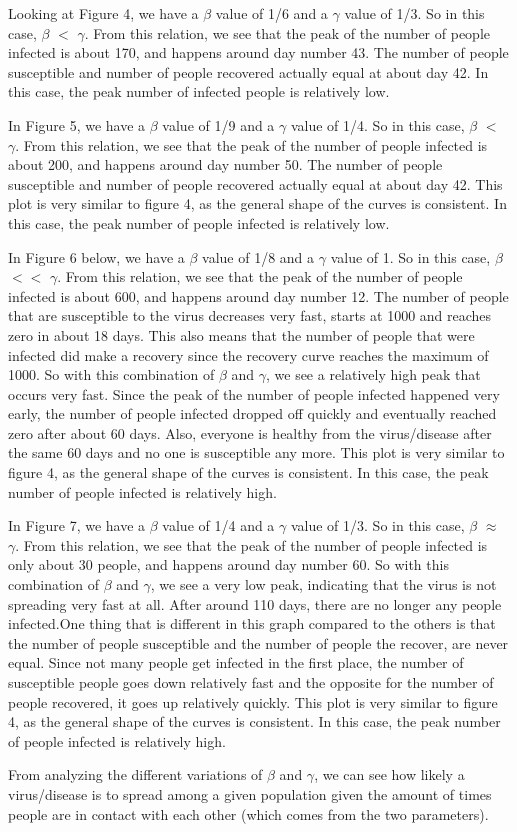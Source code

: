 \documentclass{article}
\begin{document}
Looking at Figure 4, we have a $\beta$ value of 1/6 and a $\gamma$ value of 1/3. 
So in this case, $\beta$ $<$ $\gamma$.
From this relation, we see that the peak of the number of people infected is about 170, and happens around day number 43.
The number of people susceptible and number of people recovered actually equal at  about day 42.
In this case, the peak number of infected people is relatively low.
\bigskip

In Figure 5, we have a $\beta$ value of 1/9 and a $\gamma$ value of 1/4. 
So in this case, $\beta$ $<$ $\gamma$.
From this relation, we see that the peak of the number of people infected is about 200, and happens around day number 50.
The number of people susceptible and number of people recovered actually equal at  about day 42.
This plot is very similar to figure 4, as the general shape of the curves is consistent.
In this case, the peak number of people infected is relatively low.
\bigskip

In Figure 6 below, we have a $\beta$ value of 1/8 and a $\gamma$ value of 1. 
So in this case, $\beta$ $<<$ $\gamma$.
From this relation, we see that the peak of the number of people infected is about 600, and happens around day number 12.
The number of people that are susceptible to the virus decreases very fast, starts at 1000 and reaches zero in about 18 days.
This also means that the number of people that were infected did make a recovery since the recovery curve reaches the maximum of 1000.
So with this combination of $\beta$ and $\gamma$, we see a relatively high peak that occurs very fast.
Since the peak of the number of people infected happened very early, the number of people infected dropped off quickly and eventually reached zero after about 60 days.
Also, everyone is healthy from the virus/disease after the same 60 days and no one is susceptible any more.
This plot is very similar to figure 4, as the general shape of the curves is consistent.
In this case, the peak number of people infected is relatively high.
\bigskip

In Figure 7, we have a $\beta$ value of 1/4 and a $\gamma$ value of 1/3. 
So in this case, $\beta$ $\approx$ $\gamma$.
From this relation, we see that the peak of the number of people infected is only about 30 people, and happens around day number 60.
So with this combination of $\beta$ and $\gamma$, we see a very low peak, indicating that the virus is not spreading very fast at all.
After around 110 days, there are no longer any people infected.One thing that is different in this graph compared to the others is that the number of people susceptible and the number of people the recover, are never equal. Since not many people get infected in the first place, the number of susceptible people goes down relatively fast and the opposite for the number of people recovered, it goes up relatively quickly.
This plot is very similar to figure 4, as the general shape of the curves is consistent.
In this case, the peak number of people infected is relatively high.

\bigskip
From analyzing the different variations of $\beta$ and $\gamma$, we can see how likely a virus/disease is to spread among a given population given the amount of times people are in contact with each other (which comes from the two parameters).
\end{document}

